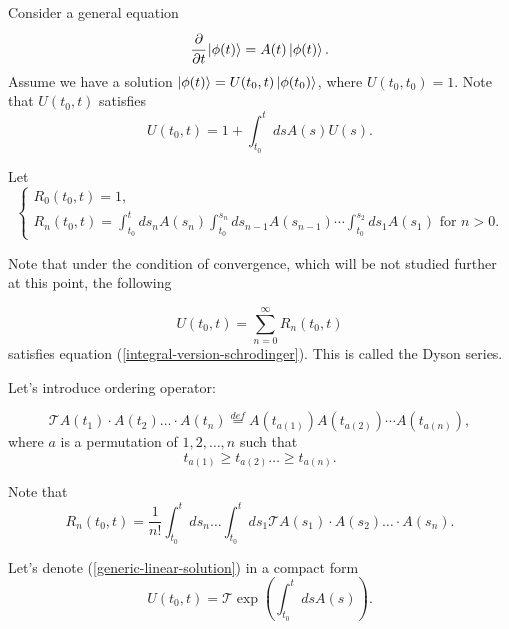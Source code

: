 \documentclass[main.tex]{subfiles}
\begin{document}
Consider a general equation
\begin{equation}
\cfrac{\partial}{\partial t}\ket{\phi(t)} = A(t) \ket{\phi(t)}.
\end{equation}
Assume we have a solution $\ket{\phi(t)} = U(t_0, t)\ket{\phi(t_0)}$, where $U(t_0, t_0) = 1$. Note that 
$U(t_0, t)$ satisfies
\begin{equation}
\label{integral-version-schrodinger}
U(t_0, t) = 1 + \int_{t_0}^t ds A(s)U(s).
\end{equation}

Let
\begin{equation}
\begin{cases}
R_0(t_0, t) = 1,\\
R_n(t_0, t) = \int_{t_0}^t ds_n A(s_n) \int_{t_0}^{s_{n}} ds_{n - 1}A(s_{n-1}) \cdots \int_{t_0}^{s_2} ds_1 A(s_1)\text{ for } n > 0.
\end{cases}
\end{equation}

Note that under the condition of convergence, which will be not studied further at this point, the following

\begin{equation}
\label{generic-linear-solution}
U(t_0, t) = \sum_{n=0}^\infty R_n(t_0, t)
\end{equation}
satisfies equation (\ref{integral-version-schrodinger}). This is called the Dyson series.

Let's introduce ordering operator:
\begin{definition}
\begin{equation}
\mathcal{T} A(t_1)\cdot A(t_2) \dots \cdot A(t_n) \stackrel{def}{=} A(t_{a(1)})A(t_{a(2)})\cdots A(t_{a(n)}),
\end{equation} 
where $a$ is a permutation of $1, 2, \dots, n$ such that
\begin{equation}
t_{a(1)} \geq t_{a(2)} \dots \geq t_{a(n)}.
\end{equation}
\end{definition}

Note that
\begin{equation}
R_n(t_0, t) = \frac{1}{n!} \int_{t_0}^t ds_n \dots\int_{t_0}^t ds_1 \mathcal{T} A(s_1)\cdot A(s_2) \dots \cdot A(s_n).
\end{equation}

Let's denote (\ref{generic-linear-solution}) in a compact form
\begin{equation}
\label{generic-linear-solution2}
U(t_0, t) = \mathcal{T} \exp(\int_{t_0}^t ds A(s)).
\end{equation}
\end{document}
